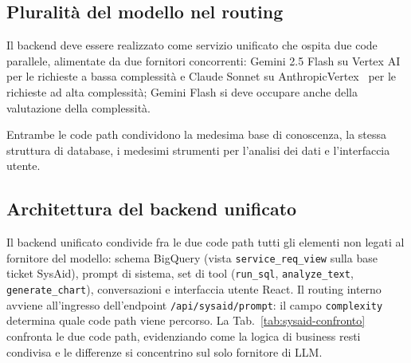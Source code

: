 \subsection{Pluralità del modello nel routing}
\label{subsec:agenti-sysaid-confronto}

Il backend deve essere realizzato come servizio unificato che ospita due code parallele, alimentate da due fornitori concorrenti:
Gemini 2.5 Flash su Vertex AI~\cite{gcp_vertexai} per le richieste a bassa complessità e
Claude Sonnet su AnthropicVertex~\cite{anthropic_docs} per le richieste ad alta complessità;
Gemini Flash si deve occupare anche della valutazione della complessità.

Entrambe le code path condividono la medesima base di conoscenza, la stessa struttura di database,
i medesimi strumenti per l'analisi dei dati e l'interfaccia utente.

\subsection{Architettura del backend unificato}
\label{subsec:sysaid-arch-unificata}

Il backend unificato condivide fra le due code path tutti gli elementi non
legati al fornitore del modello: schema BigQuery (vista \texttt{service\_req\_view}
sulla base ticket SysAid), prompt di sistema, set di tool
(\texttt{run\_sql}, \texttt{analyze\_text}, \texttt{generate\_chart}),
conversazioni e interfaccia utente React. Il routing interno avviene
all'ingresso dell'endpoint \texttt{/api/sysaid/prompt}: il campo
\texttt{complexity} determina quale code path viene percorso. La
Tab.~\ref{tab:sysaid-confronto} confronta le due code path, evidenziando come la logica di business resti condivisa e le differenze si concentrino sul solo fornitore di LLM.

